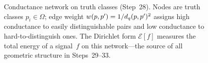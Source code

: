 \begin{figure}[ht]
\caption{Conductance network on truth classes (Step~28).  Nodes are truth
  classes $p_i \in \Omega$; edge weight $w(p,p') = 1/d_q(p,p')^2$
  assigns high conductance to easily distinguishable pairs and low
  conductance to hard-to-distinguish ones.  The Dirichlet form
  $\mathcal{E}[f]$ measures the total energy of a signal~$f$ on this
  network---the source of all geometric structure in Steps~29--33.}
\label{fig:dirichlet-network}
\end{figure}

